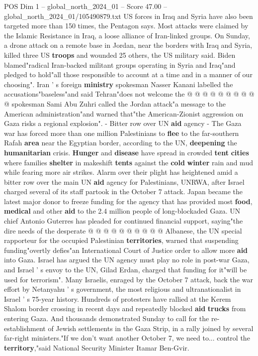 \begin{textsample}{POS Dim 1 – global\_north\_2024\_01 – Score 47.00 – global\_north\_2024\_01/105490879.txt}
US forces in Iraq and Syria have also been targeted more than 150 times, the Pentagon says.
Most attacks were claimed by the Islamic Resistance in Iraq, a loose alliance of Iran-linked groups.
On Sunday, a drone attack on a remote base in Jordan, near the borders with Iraq and Syria, killed three US \textbf{troops} and wounded 25 others, the US military said.
Biden blamed"radical Iran-backed militant groups operating in Syria and Iraq"and pledged to hold"all those responsible to account at a time and in a manner of our choosing".
Iran ' s foreign \textbf{ministry} spokesman Nasser Kanani labelled the accusations"baseless"and said Tehran"does not welcome the @ @ @ @ @ @ @ @ @ @ spokesman Sami Abu Zuhri called the Jordan attack"a message to the American administration"and warned that"the American-Zionist aggression on Gaza risks a regional explosion". - Bitter row over UN \textbf{aid} agency - The Gaza war has forced more than one million Palestinians to \textbf{flee} to the far-southern Rafah \textbf{area} near the Egyptian border, according to the UN, \textbf{deepening} the \textbf{humanitarian} crisis. \textbf{Hunger} and \textbf{disease} have spread in crowded \textbf{tent} \textbf{cities} where families \textbf{shelter} in makeshift \textbf{tents} against the \textbf{cold} \textbf{winter} rain and mud while fearing more air strikes.
Alarm over their plight has heightened amid a bitter row over the main UN \textbf{aid} agency for Palestinians, UNRWA, after Israel charged several of its staff partook in the October 7 attack.
Japan became the latest major donor to freeze funding for the agency that has provided most \textbf{food}, \textbf{medical} and other \textbf{aid} to the 2.4 million people of long-blockaded Gaza.
UN chief Antonio Guterres has pleaded for continued financial support, saying"the dire needs of the desperate @ @ @ @ @ @ @ @ @ @ Albanese, the UN special rapporteur for the occupied Palestinian \textbf{territories}, warned that suspending funding"overtly defies"an International Court of Justice order to allow more \textbf{aid} into Gaza.
Israel has argued the UN agency must play no role in post-war Gaza, and Israel ' s envoy to the UN, Gilad Erdan, charged that funding for it"will be used for terrorism".
Many Israelis, enraged by the October 7 attack, back the war effort by Netanyahu ' s government, the most religious and ultranationalist in Israel ' s 75-year history.
Hundreds of protesters have rallied at the Kerem Shalom border crossing in recent days and repeatedly blocked \textbf{aid} \textbf{trucks} from entering Gaza.
And thousands demonstrated Sunday to call for the re-establishment of Jewish settlements in the Gaza Strip, in a rally joined by several far-right ministers."If we don't want another October 7, we need to... control the \textbf{territory},"said National Security Minister Itamar Ben-Gvir.

\end{textsample}
